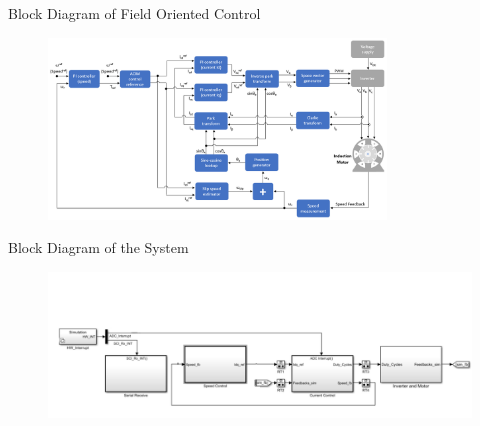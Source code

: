 


\begin{frame}{}
	\maketitle
\end{frame}

\begin{frame}{Block Diagram of Field Oriented Control}
	\begin{figure}
		\centering
		\includegraphics[width=0.8\textwidth]{sections/section2/images/blockDiagram.png}
	\end{figure}
\end{frame}

\begin{frame}{Block Diagram of the System}
	\begin{figure}
		\centering
		\includegraphics[width=\textwidth]{sections/section3/images/simulation/blockDia.png}
	\end{figure}
\end{frame}

